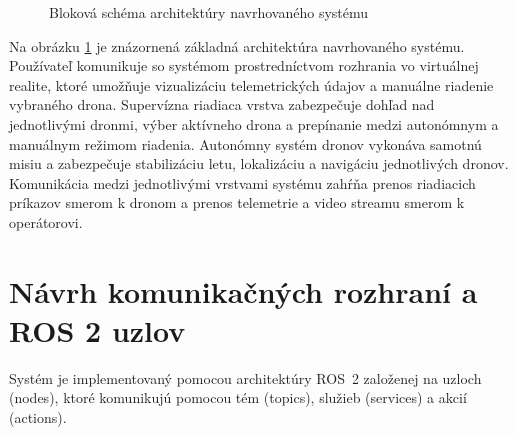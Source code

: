 \documentclass[a4paper,12pt]{article}
\begin{document}
\begin{figure}[h!]
\centering


\caption{Bloková schéma architektúry navrhovaného systému}
\label{fig:system_architecture}

\end{figure}

Na obrázku \ref{fig:system_architecture} je znázornená základná architektúra navrhovaného systému. 
Používateľ komunikuje so systémom prostredníctvom rozhrania vo virtuálnej realite, ktoré umožňuje 
vizualizáciu telemetrických údajov a manuálne riadenie vybraného drona. Supervízna riadiaca vrstva 
zabezpečuje dohľad nad jednotlivými dronmi, výber aktívneho drona a prepínanie medzi autonómnym 
a manuálnym režimom riadenia. Autonómny systém dronov vykonáva samotnú misiu a zabezpečuje 
stabilizáciu letu, lokalizáciu a navigáciu jednotlivých dronov. Komunikácia medzi jednotlivými 
vrstvami systému zahŕňa prenos riadiacich príkazov smerom k dronom a prenos telemetrie a video 
streamu smerom k operátorovi.

\section{Návrh komunikačných rozhraní a ROS 2 uzlov}

Systém je implementovaný pomocou architektúry ROS~2 založenej na uzloch (nodes), ktoré komunikujú pomocou tém (topics), služieb (services) a akcií (actions).
\end{document}
